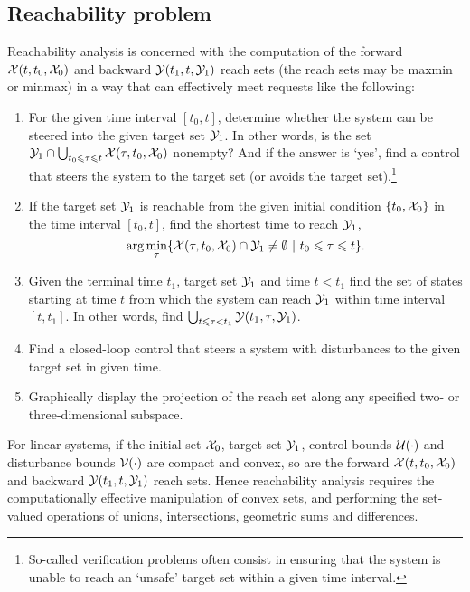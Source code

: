 \subsection{Reachability problem}
Reachability analysis is concerned with the computation of the forward
$\XX(t, t_0, \XX_0)$ and backward  $\YY(t_1, t, \YY_1)$ reach sets (the
reach sets may  be maxmin or minmax)
in a way that can effectively meet requests like the following:
\begin{enumerate}
\item For the given time interval $[t_0, t]$,
determine whether the system can be steered into the given target set $\YY_1$.
In other words, is the set
$\YY_1\cap\bigcup_{t_0 \leq\tau\leq t}\XX(\tau, t_0, \XX_0)$ nonempty?
And if the answer is `yes', find a  control that steers the system to the target set (or avoids the target set).\footnote{So-called verification problems often consist in ensuring
 that the system is unable to reach an `unsafe' target set within a given
time interval.}

\item If the target set $\YY_1$ is reachable from the given initial
condition $\{t_0, \XX_0\}$ in the time interval $[t_0, t]$,
find the shortest time to reach $\YY_1$,
\[ \arg\min_{\tau}
\{\XX(\tau,t_0,\XX_0)\cap\YY_1\neq\emptyset ~|~ t_0\leq\tau\leq t\}. \]

\item Given the terminal time $t_1$, target set $\YY_1$ and time $t<t_1$
find the set of states starting at time $t$ from which  the system can reach
$\YY_1$ within time interval $[t, t_1]$.
In other words, find $\bigcup_{t\leq\tau<t_1}\YY(t_1, \tau, \YY_1)$.

\item Find a closed-loop control that steers a system with disturbances
to the given target set in given time.

\item Graphically display the projection of the reach set along any
specified two- or three-dimensional subspace.
\end{enumerate}
For linear systems, if the initial set $\XX_0$, target set $\YY_1$, control
bounds $\UU(\cdot)$ and disturbance bounds $\VV(\cdot)$ are compact and convex,
so are the forward $\XX(t, t_0, \XX_0)$ and backward $\YY(t_1, t, \YY_1)$
reach sets.
Hence reachability analysis requires the computationally effective manipulation
of convex sets, and performing the set-valued operations of unions,
intersections, geometric sums and differences.

